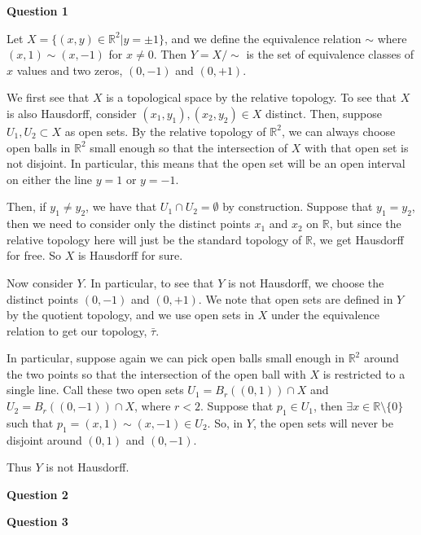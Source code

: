 \documentclass[10pt]{article}
\newcommand{\R}{\mathbb{R}}
\begin{document}
\textbf{Question 1}

Let $X = \{(x,y)\in\R^{2} | y=\pm 1\}$, and we define the equivalence relation $\sim$ where $(x,1) \sim (x,-1)$ for $x \neq 0$. Then $Y = X/\sim$ is the set of equivalence classes of $x$ values and two zeros, $(0,-1)$ and $(0,+1)$. 

We first see that $X$ is a topological space by the relative topology. To see that $X$ is also Hausdorff, consider $(x_{1},y_{1}), (x_{2},y_{2}) \in X$ distinct. Then, suppose $U_{1}, U_{2} \subset X$ as open sets. By the relative topology of $\R^{2}$, we can always choose open balls in $\R^{2}$ small enough so that the intersection of $X$ with that open set is not disjoint. In particular, this means that the open set will be an open interval on either the line $y=1$ or $y=-1$.

Then, if $y_{1} \neq y_{2}$, we have that $U_{1}\cap U_{2} = \emptyset$ by construction. Suppose that $y_{1} = y_{2}$, then we need to consider only the distinct points $x_{1}$ and $x_{2}$ on $\R$, but since the relative topology here will just be the standard topology of $\R$, we get Hausdorff for free. So $X$ is Hausdorff for sure.

Now consider $Y$. In particular, to see that $Y$ is not Hausdorff, we choose the distinct points $(0,-1)$ and $(0,+1)$. We note that open sets are defined in $Y$ by the quotient topology, and we use open sets in $X$ under the equivalence relation to get our topology, $\bar{\tau}$.

In particular, suppose again we can pick open balls small enough in $\R^{2}$ around the two points so that the intersection of the open ball with $X$ is restricted to a single line. Call these two open sets $U_{1} = B_{r}((0,1))\cap X$ and $U_{2} = B_{r}((0,-1))\cap X$, where $r < 2$. Suppose that $p_{1} \in U_{1}$, then $\exists x \in \R\setminus \{0\}$ such that $p_{1} = (x,1) \sim (x,-1) \in U_{2}$. So, in $Y$, the open sets will never be disjoint around $(0,1)$ and $(0,-1)$.

Thus $Y$ is not Hausdorff.


\newpage

\textbf{Question 2}

\newpage

\textbf{Question 3}
\end{document}
